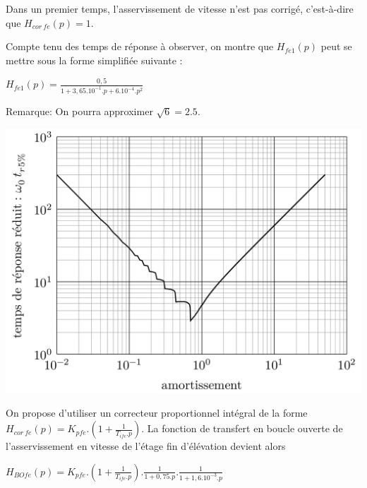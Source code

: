 Dans un premier temps, l'asservissement de vitesse n'est pas corrigé, c'est-à-dire que $H_{cor\ fe} (p)=1$.


Compte tenu des temps de réponse à observer, on montre que $H_{fe1}(p)$ peut se mettre sous la forme simplifiée suivante :
\begin{center}
$H_{fe1}(p)=\frac{0,5}{1+3,65.10^{-1}.p+6.10^{-4}.p^2}$
\end{center}

Remarque: On pourra approximer $\sqrt{6}=2.5$.


\begin{center}
\includegraphics[width=0.7\linewidth]{img/fig14}
\end{center}

On propose d'utiliser un correcteur proportionnel intégral de la forme $H_{cor\ fe}(p)=K_{pfe}.\left(1+\frac{1}{T_{ife}.p}\right)$. La fonction de transfert en boucle ouverte de l'asservissement en vitesse de l'étage fin d'élévation devient alors

\begin{center}
$H_{BOfe}(p)=K_{pfe}.\left(1+\frac{1}{T_{ife}.p}\right).\frac{1}{1+0,75.p}.\frac{1}{1+1,6.10^{-3}.p}$
\end{center}

